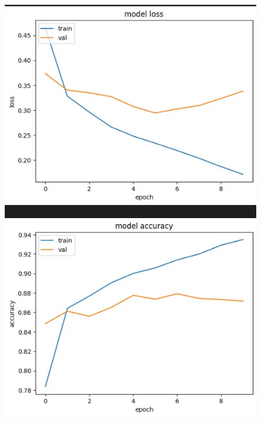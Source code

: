\documentclass{article}
\begin{document}
\begin{figure}[!h]
    \centering\includegraphics[scale=.65]{./LSTM-[16, 16]-[64, 16, 16]}
    \caption{}\label{fig.45}
\end{figure}
\end{document}
